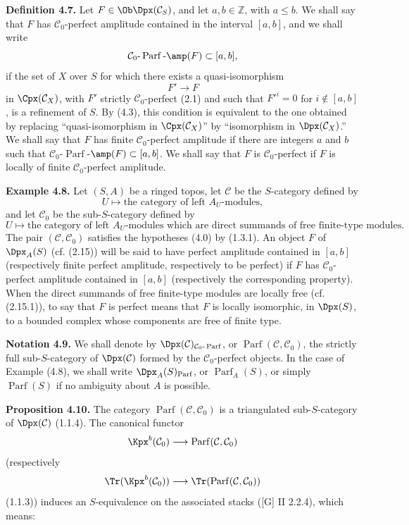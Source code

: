 \documentclass[11pt]{article}
\newcommand{\Parf}{\operatorname{Parf}}
\begin{document}
\textbf{Definition 4.7.} Let \(F\in\Ob\Dpx(\mathcal C_S)\), and let \(a,b\in\mathbb Z\), with \(a\leq b\). We shall say that \(F\) has \(\mathcal C_0\)-perfect amplitude contained in the interval \([a,b]\), and we shall write
\[
  \mathcal C_0\text{-}\Parf\text{-}\amp(F)\subset[a,b],
\]
if the set of \(X\) over \(S\) for which there exists a quasi-isomorphism
\[
  F'\longrightarrow F
\]
in \(\Cpx(\mathcal C_X)\), with \(F'\) strictly \(\mathcal C_0\)-perfect (2.1) and such that \(F'^i=0\) for \(i\notin[a,b]\), is a refinement of \(S\). By (4.3), this condition is equivalent to the one obtained by replacing ``quasi-isomorphism in \(\Cpx(\mathcal C_X)\)'' by ``isomorphism in \(\Dpx(\mathcal C_X)\).'' We shall say that \(F\) has finite \(\mathcal C_0\)-perfect amplitude if there are integers \(a\) and \(b\) such that \(\mathcal C_0\)-\(\Parf\)-\(\amp(F)\subset[a,b]\). We shall say that \(F\) is \(\mathcal C_0\)-perfect if \(F\) is locally of finite \(\mathcal C_0\)-perfect amplitude.

\textbf{Example 4.8.} Let \((S,A)\) be a ringed topos, let \(\mathcal C\) be the \(S\)-category defined by
\[
  U\longmapsto \text{the category of left }A_U\text{-modules},
\]
and let \(\mathcal C_0\) be the sub-\(S\)-category defined by
\[
  U\longmapsto \text{the category of left }A_U\text{-modules which are direct summands of free finite-type modules}.
\]
The pair \((\mathcal C,\mathcal C_0)\) satisfies the hypotheses (4.0) by (1.3.1). An object \(F\) of \(\Dpx_A(S)\) (cf. (2.15)) will be said to have perfect amplitude contained in \([a,b]\) (respectively finite perfect amplitude, respectively to be perfect) if \(F\) has \(\mathcal C_0\)-perfect amplitude contained in \([a,b]\) (respectively the corresponding property). When the direct summands of free finite-type modules are locally free (cf. (2.15.1)), to say that \(F\) is perfect means that \(F\) is locally isomorphic, in \(\Dpx(S)\), to a bounded complex whose components are free of finite type.

\textbf{Notation 4.9.} We shall denote by \(\Dpx(\mathcal C)_{\mathcal C_0\text{-}\Parf}\), or \(\Parf(\mathcal C,\mathcal C_0)\), the strictly full sub-\(S\)-category of \(\Dpx(\mathcal C)\) formed by the \(\mathcal C_0\)-perfect objects. In the case of Example (4.8), we shall write \(\Dpx_A(S)_{\Parf}\), or \(\Parf_A(S)\), or simply \(\Parf(S)\) if no ambiguity about \(A\) is possible.

\textbf{Proposition 4.10.} The category \(\Parf(\mathcal C,\mathcal C_0)\) is a triangulated sub-\(S\)-category of \(\Dpx(\mathcal C)\) (1.1.4). The canonical functor
\[
  \Kpx^b(\mathcal C_0)\longrightarrow \Parf(\mathcal C,\mathcal C_0)
\]
(respectively
\[
  \Tr(\Kpx^b(\mathcal C_0))\longrightarrow \Tr(\Parf(\mathcal C,\mathcal C_0))
\]
(1.1.3)) induces an \(S\)-equivalence on the associated stacks ([G] II 2.2.4), which means:
\end{document}
